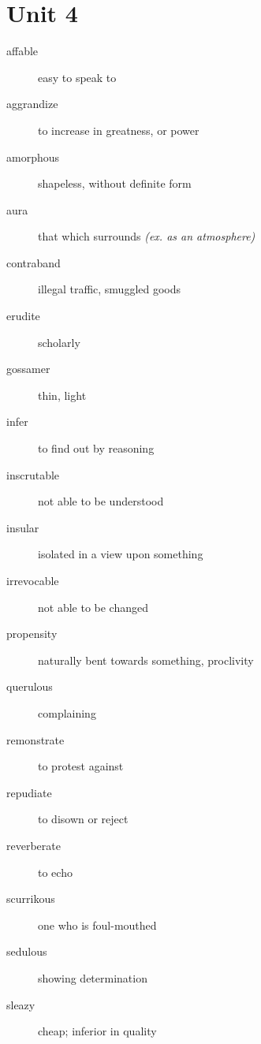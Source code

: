 \section{Unit 4}
\begin{description}
  \item[affable] easy to speak to
  \item[aggrandize] to increase in greatness, or power
  \item[amorphous] shapeless, without definite form
  \item[aura] that which surrounds \textit{(ex. as an atmosphere)}
  \item[contraband] illegal traffic, smuggled goods
  \item[erudite] scholarly
  \item[gossamer] thin, light
  \item[infer] to find out by reasoning
  \item[inscrutable] not able to be understood
  \item[insular] isolated in a view upon something
  \item[irrevocable] not able to be changed
  \item[propensity] naturally bent towards something, proclivity
  \item[querulous] complaining
  \item[remonstrate] to protest against
  \item[repudiate] to disown or reject
  \item[reverberate] to echo
  \item[scurrikous] one who is foul-mouthed
  \item[sedulous] showing determination
  \item[sleazy] cheap; inferior in quality
\end{description}


